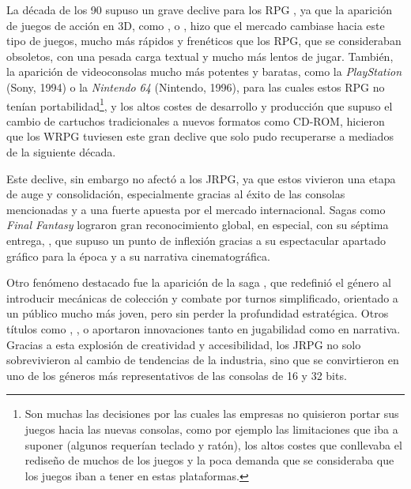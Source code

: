 \medskip

La década de los 90 supuso un grave declive para los RPG , ya que la aparición de juegos de acción en 3D, como ,  o , hizo que el mercado cambiase hacia este tipo de juegos, mucho más rápidos y frenéticos que los RPG, que se consideraban obsoletos, con una pesada carga textual y mucho más lentos de jugar. También, la aparición de videoconsolas mucho más potentes y baratas, como la \textit{PlayStation} (Sony, 1994) o la \textit{Nintendo 64} (Nintendo, 1996), para las cuales estos RPG no tenían portabilidad\footnote{Son muchas las decisiones por las cuales las empresas  no quisieron portar sus juegos hacia las nuevas consolas, como por ejemplo las limitaciones que iba a suponer (algunos requerían teclado y ratón), los altos costes que conllevaba el rediseño de muchos de los juegos y la poca demanda que se consideraba que los juegos iban a tener en estas plataformas.}, y los altos costes de desarrollo y producción que supuso el cambio de cartuchos tradicionales a nuevos formatos como CD-ROM, hicieron que los WRPG tuviesen este gran declive que solo pudo recuperarse a mediados de la siguiente década.

\medskip

Este declive, sin embargo no afectó a los JRPG, ya que estos vivieron una etapa de auge y consolidación, especialmente gracias al éxito de las consolas mencionadas y a una fuerte apuesta por el mercado internacional. Sagas como \textit{Final Fantasy} lograron gran reconocimiento global, en especial, con su séptima entrega, \cite{ffvii}, que supuso un punto de inflexión gracias a su espectacular apartado gráfico para la época y a su narrativa cinematográfica. 

\smallskip

Otro fenómeno destacado fue la aparición de la saga \cite{pokemon}, que redefinió el género al introducir mecánicas de colección y combate por turnos simplificado, orientado a un público mucho más joven, pero sin perder la profundidad estratégica. Otros títulos como \cite{chronotrigger}, \cite{secretofmana}, o \cite{suikoden} aportaron innovaciones tanto en jugabilidad como en narrativa. Gracias a esta explosión de creatividad y accesibilidad, los JRPG no solo sobrevivieron al cambio de tendencias de la industria, sino que se convirtieron en uno de los géneros más representativos de las consolas de 16 y 32 bits.

\medskip


